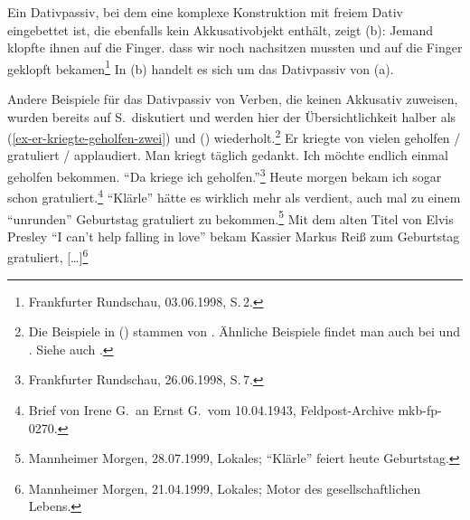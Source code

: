 Ein Dativpassiv, bei dem eine komplexe Konstruktion mit freiem Dativ eingebettet ist,
die ebenfalls kein Akkusativobjekt enthält, zeigt (b):
\eal
\ex Jemand klopfte ihnen auf die Finger.
\ex\label{bsp-auf-die-finger-geklopft-bekommen}
dass wir noch nachsitzen mussten und auf die Finger geklopft bekamen\footnote{
        Frankfurter Rundschau, 03.06.1998, S.\,2.%
}
\zl
In (b) handelt es sich um das Dativpassiv von (a).
%

Andere Beispiele für das Dativpassiv von Verben, die keinen Akkusativ
zuweisen, wurden bereits auf S.\,\pageref{ex-er-kriegte-geholfen}
diskutiert und werden hier der Übersichtlichkeit halber
als (\ref{ex-er-kriegte-geholfen-zwei}) und () wiederholt.\footnote{
        Die Beispiele in () stammen von \textcites[]{Wegener85a}[]{Wegener90}.
        Ähnliche Beispiele findet man auch bei  und
        . Siehe auch .%
}
\eal
\label{ex-er-kriegte-geholfen-zwei}
\ex{}
Er kriegte von vielen geholfen / gratuliert / applaudiert.
\ex{} 
Man kriegt täglich gedankt.
\ex Ich möchte endlich einmal geholfen bekommen.
\zl
\eal
\ex
"`Da kriege ich geholfen."'\footnote{
Frankfurter Rundschau, 26.06.1998, S.\,7.%
}
\ex
Heute morgen bekam ich sogar schon gratuliert.\footnote{%
Brief von Irene G.\ an Ernst G.\ vom 10.04.1943, Feldpost-Archive mkb-fp-0270.}
\ex
"`Klärle"' hätte es wirklich mehr als verdient, auch mal zu einem "`unrunden"' Geburtstag gratuliert zu bekommen.\footnote{
Mannheimer Morgen, 28.07.1999, Lokales; "`Klärle"' feiert heute Geburtstag.%
}
\ex Mit dem alten Titel von Elvis Presley "`I can't help falling in love"' 
    bekam Kassier Markus Reiß zum Geburtstag gratuliert, [\ldots]\footnote{
Mannheimer Morgen, 21.04.1999, Lokales; Motor des gesellschaftlichen Lebens.%
}
\zl

